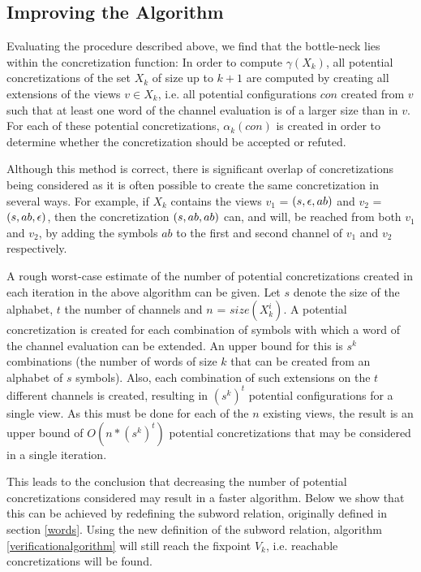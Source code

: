 \subsection{Improving the Algorithm}
Evaluating the procedure described above, we find that the bottle-neck lies within the concretization function:
 In order to compute $\gamma(X_k)$, all potential concretizations of the set $X_k$ of size up to $k+1$ are computed by creating all extensions of the views $v \in X_k$, i.e. all potential configurations $con$ created from $v$ such that at least one word of the channel evaluation is of a larger size than in $v$. For each of these potential concretizations, $\alpha_k(con)$ is created in order to determine whether the concretization should be accepted or refuted.

Although this method is correct, there is significant overlap of concretizations being considered as it is often possible to create the same concretization  in several ways. For example, if $X_k$ contains the views $v_1$ = $(s, \epsilon, ab)$ and $v_2$ = $(s, ab, \epsilon)$, then the concretization $(s, ab,ab)$ can, and will, be reached from both $v_1$ and $v_2$, by adding the symbols $ab$ to the first and second channel of $v_1$ and $v_2$ respectively.

A rough worst-case estimate of the number of potential concretizations created in each iteration in the above algorithm can be given. Let $s$ denote the size of the alphabet, $t$ the number of channels and $n$ = $size(X_k^i)$. A potential concretization is created for each combination of symbols with which a word of the channel evaluation can be extended. An upper bound for this is $s^k$ combinations (the number of words of size $k$ that can be created from an alphabet of $s$ symbols). Also, each combination of such extensions on the $t$ different channels is created, resulting in $(s^k)^t$ potential configurations for a single view. As this must be done for each of the $n$ existing views, the result is an upper bound of $O(n*(s^k)^t)$ potential concretizations that may be considered in a single iteration.

This leads to the conclusion that decreasing the number of potential concretizations considered may result in a faster algorithm. Below we show that this can be achieved by redefining the subword relation, originally defined in section \ref{words}. Using the new definition of the subword relation, algorithm \ref{verificationalgorithm} will still reach the fixpoint $V_k$, i.e. reachable concretizations will be found.

